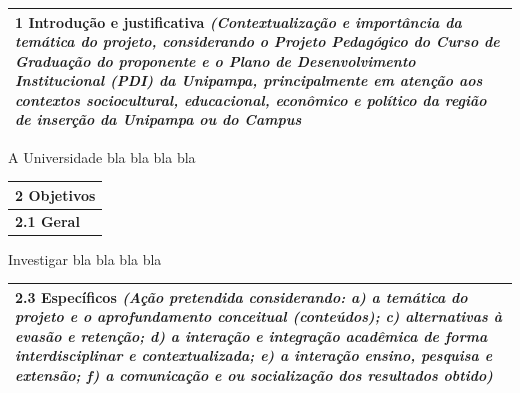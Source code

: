 \documentclass[
  11pt,				
  openright,	
  twoside,	
  a4paper,
  brazil,	
  oldfontcommands,
  ]{abntex2}
\begin{document}
\begin{table}[H]
\begin{center}
\begin{tabularx}{\textwidth}{|X|}
\hline
{\bf 1 Introdução e justificativa} \textit{(Contextualização e importância da temática do projeto, considerando o Projeto Pedagógico do Curso de Graduação do proponente e o Plano de Desenvolvimento Institucional (PDI) da Unipampa, principalmente em atenção aos contextos sociocultural, educacional, econômico e político da região de inserção da Unipampa ou do Campus}\\\hline
\end{tabularx}
\end{center}
\end{table}
\vspace{-10mm}

A Universidade bla bla bla bla



\begin{table}[H]
\begin{center}
\begin{tabularx}{\textwidth}{|X|}
\hline
{\bf 2 Objetivos}\\\hline
{\bf 2.1 Geral}\\\hline
\end{tabularx}
\end{center}
\end{table}
\vspace{-10mm}

Investigar bla bla bla bla 

\begin{table}[H]
\begin{center}
\begin{tabularx}{\textwidth}{|X|}
\hline
{\bf 2.3 Específicos} \textit{(Ação pretendida considerando: a) a temática do projeto e o aprofundamento conceitual (conteúdos);
 c) alternativas à evasão e retenção; d) a interação e integração acadêmica de forma interdisciplinar e contextualizada; e) a interação ensino, pesquisa e extensão; f) a comunicação e ou socialização dos resultados obtido)}\\\hline
\end{tabularx}
\end{center}
\end{table}
\vspace{-10mm}
\end{document}
